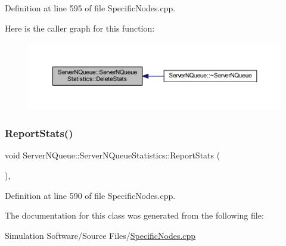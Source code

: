 Definition at line 595 of file Specific\+Nodes.\+cpp.

Here is the caller graph for this function\+:\nopagebreak
\begin{figure}[H]
\begin{center}
\leavevmode
\includegraphics[width=350pt]{class_server_n_queue_1_1_server_n_queue_statistics_ade4ec4cac903d382590362780a94b14d_icgraph}
\end{center}
\end{figure}
\mbox{\label{class_server_n_queue_1_1_server_n_queue_statistics_a65e23fedacbcba37a1033a690d7b10fd}} 
\subsubsection{\texorpdfstring{Report\+Stats()}{ReportStats()}}
{\footnotesize\ttfamily void Server\+N\+Queue\+::\+Server\+N\+Queue\+Statistics\+::\+Report\+Stats (\begin{DoxyParamCaption}{ }\end{DoxyParamCaption})\hspace{0.3cm}{\ttfamily [inline]}, {\ttfamily [override]}}



Definition at line 590 of file Specific\+Nodes.\+cpp.



The documentation for this class was generated from the following file\+:\begin{DoxyCompactItemize}
\item 
Simulation Software/\+Source Files/\hyperlink{_specific_nodes_8cpp}{Specific\+Nodes.\+cpp}\end{DoxyCompactItemize}
